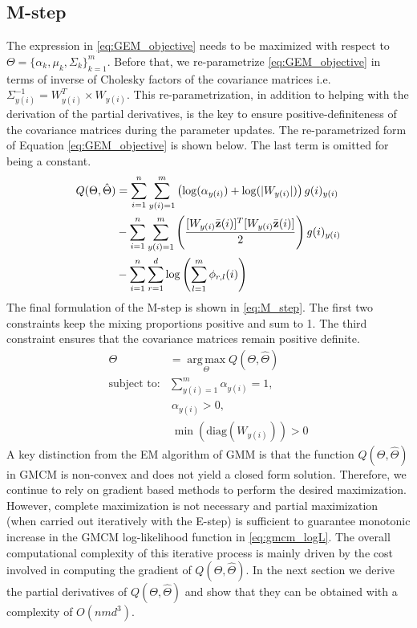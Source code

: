 \documentclass[]{article}
\begin{document}
\subsection{M-step}
The expression in \ref{eq:GEM_objective} needs to be maximized with respect to $\Theta = \lbrace \alpha_{k},\mu_{k},\Sigma_{k} \rbrace_{k=1}^m$.  Before that, we re-parametrize  \eqref{eq:GEM_objective} in terms of inverse of Cholesky factors of the covariance matrices i.e. $\Sigma_{y(i)}^{-1}=W_{y(i)}^T \times W_{y(i)}$. This re-parametrization, in addition to helping with the derivation of the partial derivatives, is the key to ensure positive-definiteness of the covariance matrices during the parameter updates. The re-parametrized form of Equation \ref{eq:GEM_objective} is shown below. The last term is omitted for being a constant. 
\begin{align}\label{eq:GEM_objective_Cholesky}
Q(\Theta,\hat{\Theta}) & = \sum\limits_{i=1}^n \sum\limits_{y(i)=1}^m  \left( \log (\alpha_{y(i)}) + \log(|W_{y(i)}|)\right) g(i)_{y(i)}  \nonumber \\ 
 & -\sum\limits_{i=1}^n \sum\limits_{y(i)=1}^m  \left(\frac{[W_{y(i)}\bar{\textbf{z}}({i})]^T [W_{y(i)}\bar{\textbf{z}}({i})]}{2}\right) g(i)_{y(i)}  \nonumber \\
 & -\sum\limits_{i=1}^n \sum\limits_{r=1}^{d} \log \left(\sum\limits_{l=1}^{m} \phi_{r,l}(i)\right) \nonumber \\
\end{align}
The final formulation of the M-step is shown in \eqref{eq:M_step}. The first two constraints keep the mixing proportions positive and sum to 1. The third constraint ensures that the covariance matrices remain positive definite. 
\begin{align}\label{eq:M_step}
 \Theta  &= \operatorname*{arg\,max}_\Theta Q(\Theta,\hat{\Theta})  \\ 
 \text{subject to:}& \sum\limits_{y(i)=1}^{m}\alpha_{y(i)} = 1, \nonumber \\
& \ \alpha_{y(i)} > 0,  \nonumber \\
& \ \min \left(\text{diag}(W_{y(i)})\right) > 0 \nonumber
\end{align}
A key distinction from the EM algorithm of GMM is that the function $Q(\Theta,\hat{\Theta})$ in GMCM is non-convex and does not yield a closed form solution. Therefore, we continue to rely on gradient based methods to perform the desired maximization. However, complete maximization is not necessary and partial maximization (when carried out iteratively with the E-step) is sufficient to guarantee monotonic increase in the GMCM log-likelihood function in \eqref{eq:gmcm_logL}. The overall computational complexity of this iterative process is mainly driven by the cost involved in computing the gradient of $Q(\Theta,\hat{\Theta})$. In the next section we derive the partial derivatives of $Q(\Theta,\hat{\Theta})$ and show that they can be obtained with a complexity of $O(nmd^3)$.
\end{document}
